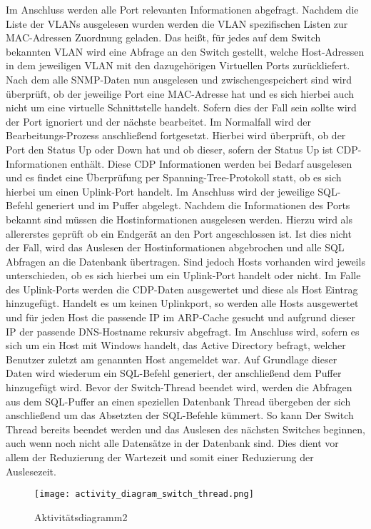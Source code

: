 Im Anschluss werden alle Port relevanten Informationen abgefragt. 
Nachdem die Liste der VLANs ausgelesen wurden werden die VLAN spezifischen Listen zur MAC-Adressen Zuordnung geladen. Das heißt, für jedes auf dem Switch bekannten VLAN wird eine Abfrage an den Switch gestellt, welche Host-Adressen in dem jeweiligen VLAN mit den dazugehörigen Virtuellen Ports zurückliefert.
Nach dem alle SNMP-Daten nun ausgelesen und zwischengespeichert sind wird überprüft, ob der jeweilige Port eine MAC-Adresse hat und es sich hierbei auch nicht um eine virtuelle Schnittstelle handelt. Sofern dies der Fall sein sollte wird der Port ignoriert und der nächste bearbeitet. Im Normalfall wird der Bearbeitungs-Prozess anschließend fortgesetzt. Hierbei wird überprüft, ob der Port den Status Up oder Down hat und ob dieser, sofern der Status Up ist CDP-Informationen enthält.
Diese CDP Informationen werden bei Bedarf ausgelesen und es findet eine Überprüfung per Spanning-Tree-Protokoll statt, ob es sich hierbei um einen Uplink-Port handelt. Im Anschluss wird der jeweilige SQL-Befehl generiert und im Puffer abgelegt.
Nachdem die Informationen des Ports bekannt sind müssen die Hostinformationen ausgelesen werden. Hierzu wird als allererstes geprüft ob ein Endgerät an den Port angeschlossen ist. Ist dies nicht der Fall, wird das Auslesen der Hostinformationen abgebrochen und alle SQL Abfragen an die Datenbank übertragen. Sind jedoch Hosts vorhanden wird jeweils unterschieden, ob es sich hierbei um ein Uplink-Port handelt oder nicht. Im Falle des Uplink-Ports werden die CDP-Daten ausgewertet und diese als Host Eintrag hinzugefügt. Handelt es um keinen Uplinkport, so werden alle Hosts ausgewertet und für jeden Host die passende IP im ARP-Cache gesucht und aufgrund dieser IP der passende DNS-Hostname rekursiv abgefragt.
Im Anschluss wird, sofern es sich um ein Host mit Windows handelt, das Active Directory befragt, welcher Benutzer zuletzt am genannten Host angemeldet war. Auf Grundlage dieser Daten wird wiederum ein SQL-Befehl generiert, der anschließend dem Puffer hinzugefügt wird.
Bevor der Switch-Thread beendet wird, werden die Abfragen aus dem SQL-Puffer an einen speziellen Datenbank Thread übergeben der sich anschließend um das Absetzten der SQL-Befehle kümmert. So kann Der Switch Thread bereits beendet werden und das Auslesen des nächsten Switches beginnen, auch wenn noch nicht alle Datensätze in der Datenbank sind. Dies dient vor allem der Reduzierung der Wartezeit und somit einer Reduzierung der Auslesezeit.

\begin{figure}[H]
\centering
\texttt{[image: activity\_diagram\_switch\_thread.png]}
\caption{Aktivitätsdiagramm2}
\label{fig:activitydiagram2}
\end{figure}

